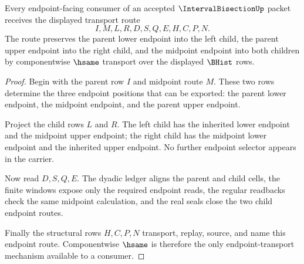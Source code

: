 \begin{theorem}
\label{thm:interval-bisection-endpoint-transport}
Every endpoint-facing consumer of an accepted $\IntervalBisectionUp$ packet receives the displayed transport route
$$
I,M,L,R,D,S,Q,E,H,C,P,N.
$$
The route preserves the parent lower endpoint into the left child, the parent upper endpoint into the right child, and the midpoint endpoint into both children by componentwise $\hsame$ transport over the displayed $\BHist$ rows.
\end{theorem}
\begin{proof}
Begin with the parent row $I$ and midpoint route $M$. These two rows determine the three endpoint positions that can be exported: the parent lower endpoint, the midpoint endpoint, and the parent upper endpoint.

Project the child rows $L$ and $R$. The left child has the inherited lower endpoint and the midpoint upper endpoint; the right child has the midpoint lower endpoint and the inherited upper endpoint. No further endpoint selector appears in the carrier.

Now read $D,S,Q,E$. The dyadic ledger aligns the parent and child cells, the finite windows expose only the required endpoint reads, the regular readbacks check the same midpoint calculation, and the real seals close the two child endpoint routes.

Finally the structural rows $H,C,P,N$ transport, replay, source, and name this endpoint route. Componentwise $\hsame$ is therefore the only endpoint-transport mechanism available to a consumer.
\end{proof}

